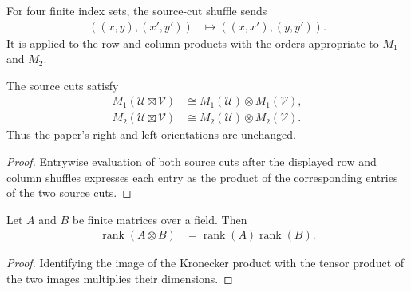 \begin{definition}
    \label{def:mpu_tensor_product_cut_shuffle}
    \leanok
    For four finite index sets, the source-cut shuffle sends
    \begin{align}
        ((x,y),(x',y'))
         & \longmapsto ((x,x'),(y,y')).
    \end{align}
    It is applied to the row and column products with the orders appropriate to
    $M_1$ and $M_2$.
\end{definition}

\begin{lemma}
    \label{thm:mpu_tensor_product_source_cuts}
    \leanok
    The source cuts satisfy
    \begin{align}
        M_1(\mathcal U\boxtimes\mathcal V)
         & \cong M_1(\mathcal U)\otimes M_1(\mathcal V), \\
        M_2(\mathcal U\boxtimes\mathcal V)
         & \cong M_2(\mathcal U)\otimes M_2(\mathcal V).
    \end{align}
    Thus the paper's right and left orientations are unchanged.
\end{lemma}

\begin{proof}\leanok
    Entrywise evaluation of both source cuts after the displayed row and column
    shuffles expresses each entry as the product of the corresponding entries of the
    two source cuts.
\end{proof}

\begin{lemma}
    \label{thm:mpu_kronecker_rank}
    \leanok
    Let $A$ and $B$ be finite matrices over a field. Then
    \begin{align}
        \operatorname{rank}(A\otimes B)
         & =\operatorname{rank}(A)\operatorname{rank}(B).
    \end{align}
\end{lemma}

\begin{proof}\leanok
    Identifying the image of the Kronecker product with the tensor product of the
    two images multiplies their dimensions.
\end{proof}

